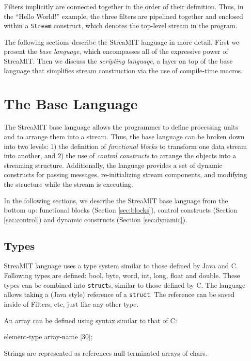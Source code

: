\documentclass[draft]{article}
\begin{document}
Filters implicitly are connected together in the order of their
definition.  Thus, in the ``Hello World!'' example, the three filters
are pipelined together and enclosed within a {\tt Stream} construct,
which denotes the top-level stream in the program.

The following sections describe the StreaMIT language in more detail.
First we present the {\it base language}, which encompasses all of the
expressive power of StreaMIT.  Then we discuss the {\it scripting
language}, a layer on top of the base language that simplifies stream
construction via the use of compile-time macros.

\section{The Base Language}

The StreaMIT base language allows the programmer to define processing
units and to arrange them into a stream.  Thus, the base language can
be broken down into two levels: 1) the definition of {\it functional
blocks} to transform one data stream into another, and 2) the use of
{\it control constructs} to arrange the objects into a streaming
structure.  Additionally, the language provides a set of dynamic
constructs for passing messages, re-initializing stream components,
and modifying the structure while the stream is executing.

In the following sections, we describe the StreaMIT base language from
the bottom up: functional blocks (Section \ref{sec:blocks}), control
constructs (Section \ref{sec:control}) and dynamic constructs (Section
\ref{sec:dynamic}).

\subsection{Types}

StreaMIT language uses a type system similar to those defined by Java and
C.  Following types are defined: bool, byte, word, int, long, float 
and double.  These types can be combined into {\tt struct}s, similar 
to those defined by C.  The language allows taking a (Java style) 
reference of a {\tt struct}.  The reference can be saved inside of 
Filters, etc, just like any other type.

An array can be defined using syntax similar to that of C:

element-type array-name [30];

Strings are represented as references null-terminated arrays of chars.
\end{document}
